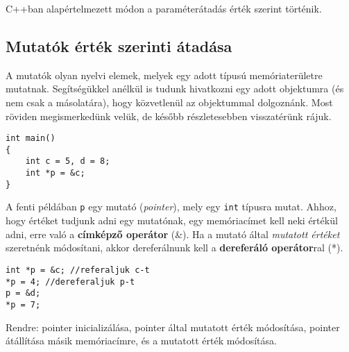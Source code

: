 \documentclass[a4paper,11.5pt,table]{article}
\begin{document}
	\begin{center}
		\smallskip
	\end{center}
	C++ban alapértelmezett módon a paraméterátadás érték szerint történik.
	\subsection{Mutatók érték szerinti átadása}
	A mutatók olyan nyelvi elemek, melyek egy adott típusú memóriaterületre mutatnak. Segítségükkel anélkül is tudunk hivatkozni egy adott objektumra (és nem csak a másolatára), hogy közvetlenül az objektummal dolgoznánk. Most röviden megismerkedünk velük, de később részletesebben visszatérünk rájuk.
	\begin{lstlisting}
int main()
{
	int c = 5, d = 8;
	int *p = &c;
}
	\end{lstlisting}
	A fenti példában \texttt{p} egy mutató (\textit{pointer}), mely egy \texttt{int} típusra mutat. Ahhoz, hogy értéket tudjunk adni egy mutatónak, egy memóriacímet kell neki értékül adni, erre való a \textbf{címképző operátor} (\&). Ha a mutató által \textit{mutatott értéket} szeretnénk módosítani, akkor dereferálnunk kell a \textbf{dereferáló operátor}ral (*).
	\begin{lstlisting}
int *p = &c; //referaljuk c-t
*p = 4; //dereferaljuk p-t
p = &d;
*p = 7;
	\end{lstlisting}
	Rendre: pointer inicializálása, pointer által mutatott érték módosítása, pointer átállítása másik memóriacímre, és a mutatott érték módosítása.
	
\end{document}
